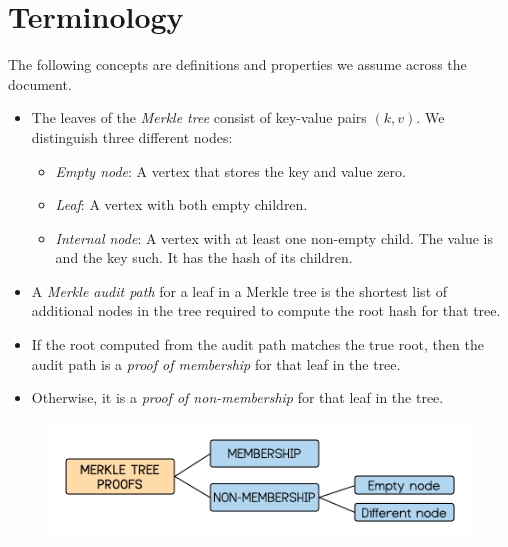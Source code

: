 \documentclass[11pt]{article}
\begin{document}
	
\section{Terminology}				%

The following concepts are definitions and properties we assume across the document.

\begin{itemize}
	\item The leaves of the {\it Merkle tree} consist of key-value pairs $(k,v)$. We distinguish three different nodes:
	\begin{itemize}
		\item {\it Empty node}: A vertex that stores the key and value zero.
		\item {\it Leaf}: A vertex with both empty children. %
		\item {\it Internal node}: A vertex with at least one non-empty child. The value is and the key such. It has the hash of its children. %
	\end{itemize}
	\item A {\it Merkle audit path} for a leaf in a Merkle tree is the shortest list of additional nodes in the tree required to compute the root hash for that tree.
	\item If the root computed from the audit path matches the true root, then the audit path is a  {\it proof of membership} for that leaf in the tree.
	\item Otherwise, it is a {\it proof of non-membership} for that leaf in the tree. 
\end{itemize}


\begin{figure}[h]
	\centering
	\includegraphics[scale=0.6]{images/MT-pfs-h.png} 
\end{figure}
\end{document}
